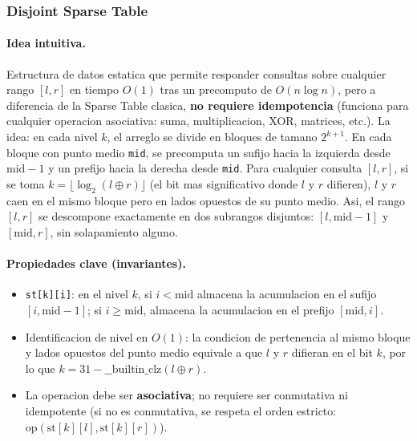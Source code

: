 \subsubsection{Disjoint Sparse Table}

\paragraph{Idea intuitiva.}
Estructura de datos estatica que permite responder consultas sobre cualquier rango $[l, r]$ en tiempo $O(1)$ tras un precomputo de $O(n \log n)$, pero a diferencia de la Sparse Table clasica, \textbf{no requiere idempotencia} (funciona para cualquier operacion asociativa: suma, multiplicacion, XOR, matrices, etc.). La idea: en cada nivel $k$, el arreglo se divide en bloques de tamano $2^{k+1}$. En cada bloque con punto medio \texttt{mid}, se precomputa un sufijo hacia la izquierda desde $\text{mid}-1$ y un prefijo hacia la derecha desde \texttt{mid}. Para cualquier consulta $[l, r]$, si se toma $k = \lfloor \log_2(l \oplus r) \rfloor$ (el bit mas significativo donde $l$ y $r$ difieren), $l$ y $r$ caen en el mismo bloque pero en lados opuestos de su punto medio. Asi, el rango $[l, r]$ se descompone exactamente en dos subrangos disjuntos: $[l, \text{mid}-1]$ y $[\text{mid}, r]$, sin solapamiento alguno.

\paragraph{Propiedades clave (invariantes).}
\begin{itemize}\setlength\itemsep{0pt}
	\item \texttt{st[k][i]}: en el nivel $k$, si $i < \text{mid}$ almacena la acumulacion en el sufijo $[i, \text{mid}-1]$; si $i \ge \text{mid}$, almacena la acumulacion en el prefijo $[\text{mid}, i]$.
	\item Identificacion de nivel en $O(1)$: la condicion de pertenencia al mismo bloque y lados opuestos del punto medio equivale a que $l$ y $r$ difieran en el bit $k$, por lo que $k = 31 - \text{\_\_builtin\_clz}(l \oplus r)$.
	\item La operacion debe ser \textbf{asociativa}; no requiere ser conmutativa ni idempotente (si no es conmutativa, se respeta el orden estricto: $\text{op}(\text{st}[k][l], \text{st}[k][r])$).
\end{itemize}

